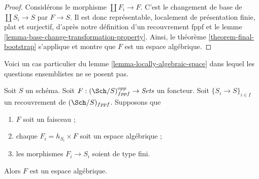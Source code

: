 \begin{proof}
Considérons le morphisme $\coprod F_i \to F$. C'est le changement de base
de $\coprod S_i \to S$ par $F \to S$. Il est donc représentable,
localement de présentation finie, plat et surjectif, d'après notre définition
d'un recouvrement fppf et le
lemme \ref{lemma-base-change-transformation-property}.
Ainsi, le
théorème \ref{theorem-final-bootstrap}
s'applique et montre que $F$ est un espace algébrique.
\end{proof}

\noindent
Voici un cas particulier du lemme \ref{lemma-locally-algebraic-space}
dans lequel les questions ensemblistes ne se posent pas.

\begin{lemma}
\label{lemma-locally-algebraic-space-finite-type}
Soit $S$ un schéma.
Soit $F : (\Sch/S)_{fppf}^{opp} \to \textit{Sets}$ un foncteur.
Soit $\{S_i \to S\}_{i \in I}$ un recouvrement de $(\Sch/S)_{fppf}$.
Supposons que
\begin{enumerate}
\item $F$ soit un faisceau ;
\item chaque $F_i = h_{S_i} \times F$ soit un espace algébrique ;
\item les morphismes $F_i \to S_i$ soient de type fini.
\end{enumerate}
Alors $F$ est un espace algébrique.
\end{lemma}


